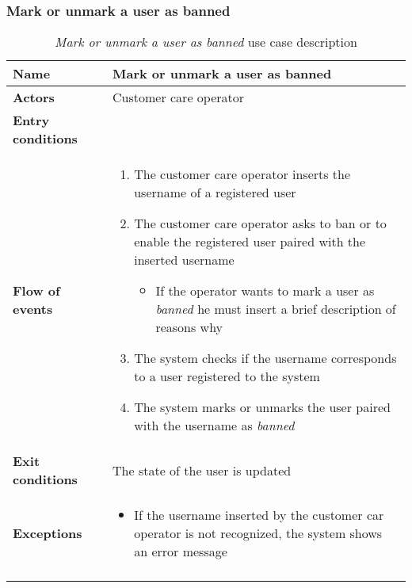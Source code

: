 \subsubsection{Mark or unmark a user as banned}
\begin{longtable}{p{0.25\linewidth}p{0.75\linewidth}}
\toprule
\textbf{Name} & \textbf{Mark or unmark a user as banned} \\
\midrule
\textbf{Actors} &  Customer care operator\\
\midrule
\textbf{Entry conditions} & \\
\midrule
\textbf{Flow of events} & 
\begin{enumerate}
	\item The customer care operator inserts the username of a registered user
	\item The customer care operator asks to ban or to enable the registered user paired with the inserted username
		\begin{itemize}
			\item If the operator wants to mark a user as \emph{banned} he must insert a brief description of reasons why  
		\end{itemize}		 
	\item The system checks if the username corresponds to a user registered to the system
	\item The system marks or unmarks the user paired with the username as \emph{banned}
\end{enumerate} \\
\midrule
\textbf{Exit conditions} & The state of the user is updated \\
\midrule
\textbf{Exceptions} & 
\begin{itemize}
	\item If the username inserted by the customer car operator is not recognized, the system shows an error message
\end{itemize} \\
\bottomrule
\caption{\emph{Mark or unmark a user as banned} use case description}
\end{longtable}

\clearpage
